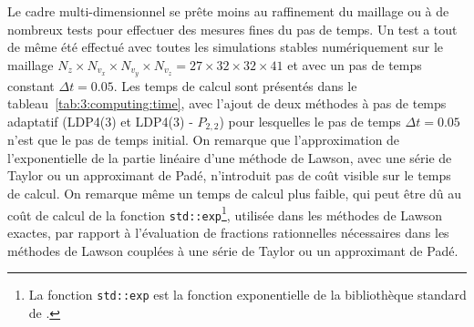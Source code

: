 Le cadre multi-dimensionnel se prête moins au raffinement du maillage ou à de nombreux tests pour effectuer des mesures fines du pas de temps. Un test a tout de même été effectué avec toutes les simulations stables numériquement sur le maillage $N_z \times N_{v_x} \times N_{v_y} \times N_{v_z}=27\times32\times32\times41$ et avec un pas de temps constant $\Delta t=0.05$. Les temps de calcul sont présentés dans le tableau~\ref{tab:3:computing:time}, avec l'ajout de deux méthodes à pas de temps adaptatif (LDP4(3) et LDP4(3) - $P_{2,2}$) pour lesquelles le pas de temps $\Delta t=0.05$ n'est que le pas de temps initial. On remarque que l'approximation de l'exponentielle de la partie linéaire d'une méthode de Lawson, avec une série de Taylor ou un approximant de Padé, n'introduit pas de coût visible sur le temps de calcul. On remarque même un temps de calcul plus faible, qui peut être dû au coût de calcul de la fonction \texttt{std::exp}\footnote{La fonction \CC{} \texttt{std::exp} est la fonction exponentielle de la bibliothèque standard de \CC{}.}, utilisée dans les méthodes de Lawson exactes, par rapport à l'évaluation de fractions rationnelles nécessaires dans les méthodes de Lawson couplées à une série de Taylor ou un approximant de Padé.

